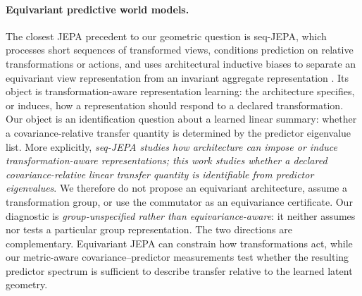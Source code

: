 \documentclass{article}
\begin{document}
\paragraph{Equivariant predictive world models.}
The closest JEPA precedent to our geometric question is seq-JEPA, which processes short sequences of transformed views, conditions prediction on relative transformations or actions, and uses architectural inductive biases to separate an equivariant view representation from an invariant aggregate representation \citep{ghaemi2025seqjepa}. Its object is transformation-aware representation learning: the architecture specifies, or induces, how a representation should respond to a declared transformation. Our object is an identification question about a learned linear summary: whether a covariance-relative transfer quantity is determined by the predictor eigenvalue list. More explicitly, \emph{seq-JEPA studies how architecture can impose or induce transformation-aware representations; this work studies whether a declared covariance-relative linear transfer quantity is identifiable from predictor eigenvalues}. We therefore do not propose an equivariant architecture, assume a transformation group, or use the commutator as an equivariance certificate. Our diagnostic is \emph{group-unspecified rather than equivariance-aware}: it neither assumes nor tests a particular group representation. The two directions are complementary. Equivariant JEPA can constrain how transformations act, while our metric-aware covariance--predictor measurements test whether the resulting predictor spectrum is sufficient to describe transfer relative to the learned latent geometry.
\end{document}
